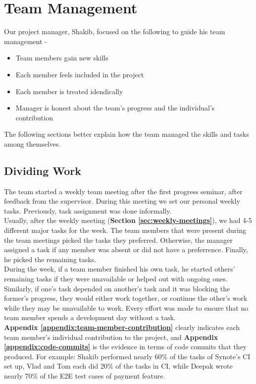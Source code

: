 \section{Team Management}
\label{sec:people-management}
Our project manager, Shakib, focused on the following to guide his team management \cite{iansommerville2011}-

\begin{itemize}

  \item Team members gain new skills
  \item Each member feels included in the project
  \item Each member is treated idendically
  \item Manager is honest about the team's progress and the individual's contribution

\end{itemize}

The following sections better explain how the team managed the skills and tasks among themselves.

\subsection{Dividing Work}
\label{subsec:dividing-work}
The team started a weekly team meeting after the first progress seminar, after feedback from the supervisor. During this meeting we set our personal weekly tasks. Previously, task assignment was done informally.\\

Usually, after the weekly meeting (\textbf{Section \ref{sec:weekly-meetings}}), we had 4-5 different major tasks for the week. The team members that were present during the team meetings picked the tasks they preferred. Otherwise, the manager assigned a task if any member was absent or did not have a preferrence. Finally, he picked the remaining tasks.\\

During the week, if a team member finished his own task, he started others' remaining tasks if they were unavailable or helped out with ongoing ones. Similarly, if one's task depended on another's task and it was blocking the former's progress, they would either work together, or continue the other's work while they may be unavailable to work. Every effort was made to ensure that no team member spends a development day without a task.\\

\textbf{Appendix \ref{appendix:team-member-contribution}} clearly indicates each team member's individual contribution to the project, and \textbf{Appendix \ref{appendix:code-commits}} is the evidence in terms of code commits that they  produced. For example: Shakib performed nearly 60\% of the tasks of Synote's CI set up, Vlad and Tom each did 20\% of the tasks in CI, while Deepak wrote nearly 70\% of the E2E test cases of payment feature.\\

